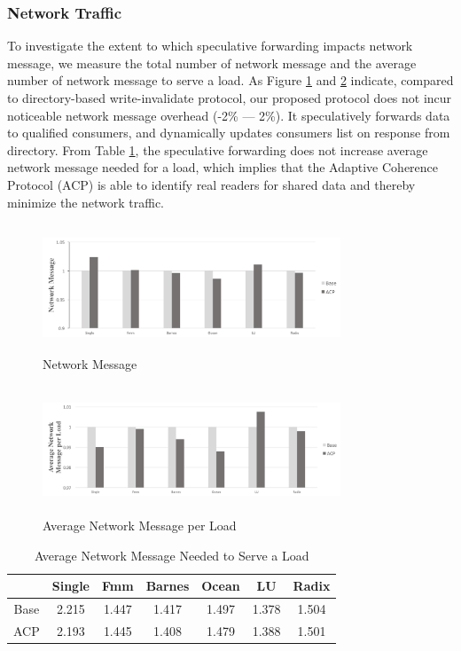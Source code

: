 \documentclass[11pt,conference]{IEEEtran}
\begin{document}
\subsubsection{Network Traffic}
To investigate the extent to which speculative forwarding impacts network message, we measure the total number of network message and the average number of network message to serve a load. As Figure \ref{network_msg} and \ref{avg_network_msg_per_load} indicate, compared to directory-based write-invalidate protocol, our proposed protocol does not incur noticeable network message overhead (-2\% --- 2\%). It speculatively forwards data to qualified consumers, and dynamically updates consumers list on response from directory. From Table \ref{table_msg}, the speculative forwarding does not increase average network message needed for a load, which implies that the Adaptive Coherence Protocol (ACP) is able to identify real readers for shared data and thereby minimize the network traffic.

\begin{figure}[!h]
\centering
\captionsetup{justification=centering}
\includegraphics[width=3.5in,height=1.5in]{network_msg.png}
\caption{Network Message}
\label{network_msg}
\end{figure}
\FloatBarrier

\begin{figure}[!h]
\centering
\captionsetup{justification=centering}
\includegraphics[width=3.5in,height=1.5in]{avg_network_msg_per_load.png}
\caption{Average Network Message per Load}
\label{avg_network_msg_per_load}
\end{figure}
\FloatBarrier

\begin{table}[!h]
\renewcommand{\arraystretch}{2.5}
\caption{Average Network Message Needed to Serve a Load}
\label{table_msg}
\centering
\begin{tabular}{|c|c|c|c|c|c|c|}
\hline
 & Single & Fmm & Barnes & Ocean & LU & Radix \\
\hline
Base & 2.215 & 1.447 & 1.417 & 1.497 & 1.378 & 1.504 \\
\hline
ACP & 2.193 & 1.445 & 1.408 & 1.479 & 1.388 & 1.501 \\
\hline
\end{tabular}
\end{table}
\FloatBarrier
\end{document}
